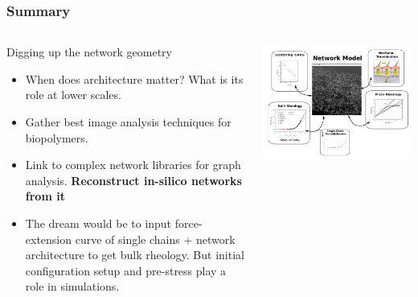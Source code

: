 \documentclass[10pt]{beamer}
\begin{document}
\begin{frame}
  \frametitle{Summary}
  \begin{columns}[onlytextwidth]
      \begin{alertblock}{Digging up the network geometry}
          \begin{itemize}
              \item When does architecture matter? What is its role at lower scales.
              \item Gather best image analysis techniques for biopolymers.
              \item Link to complex network libraries for graph analysis. \textbf{Reconstruct in-silico networks from it}
              \item \alert{The dream} would be to input force-extension curve of single chains +  network architecture to get bulk rheology. But initial configuration setup and pre-stress play a role in simulations.
          \end{itemize}
      \end{alertblock}
        \centering\includegraphics[width=\textwidth]{./Figures/network_model_fig.png}
  \end{columns}
\end{frame}
\end{document}
